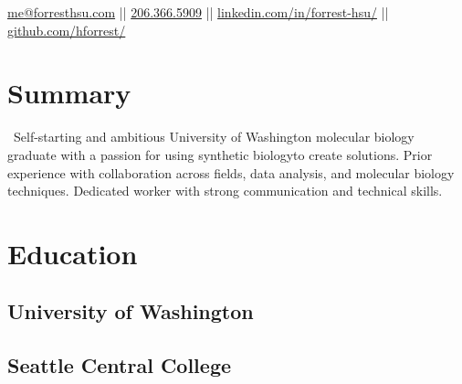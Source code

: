 \documentclass[]{forrest-resume-interfont}
\begin{document}
%
%

\lastupdated



%
%

{
	\href{mailto:me@forresthsu.com}{me@forresthsu.com} || 
	\href{tel:2063665909}{206.366.5909} || 
	\href{https://www.linkedin.com/in/forrest-hsu/}{linkedin.com/in/forrest-hsu/} ||
	\href{https://github.com/HForrest/}{github.com/hforrest/}
}

\spacesep
\section{ Summary}
\raggedright \
Self-starting and ambitious University of Washington molecular biology graduate with a passion for using synthetic biologyto create solutions. 
Prior experience with collaboration across fields, data analysis, and molecular biology techniques.
Dedicated worker with strong communication and technical skills. 
\linesep


\section{ Education}
\subsection{University of Washington}
\spacesep
\subsection{Seattle Central College}
\end{document}
